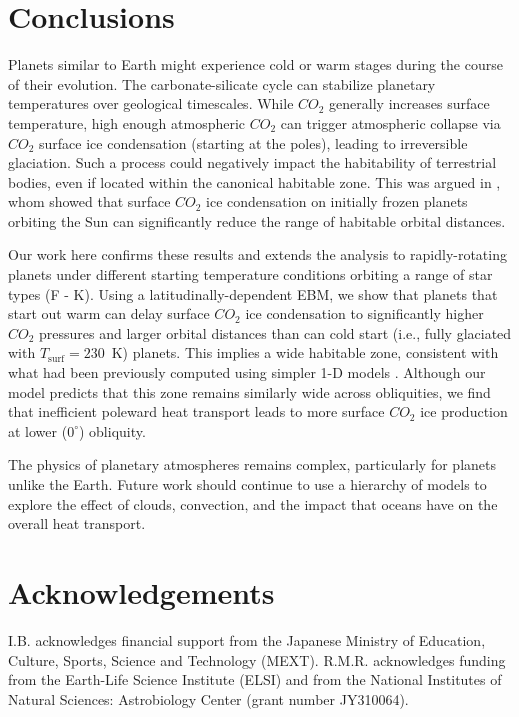\documentclass[fleqn,usenatbib]{mnras}
\begin{document}
\section{Conclusions}
Planets similar to Earth might experience cold or warm stages during the course of their evolution. The carbonate-silicate cycle can stabilize planetary temperatures over geological timescales. While  $CO_{\mathrm{2}}$ generally increases surface temperature, high enough atmospheric $CO_{\mathrm{2}}$ can trigger atmospheric collapse via $CO_{\mathrm{2}}$ surface ice condensation (starting at the poles), leading to irreversible glaciation. Such a process could negatively impact the habitability of terrestrial bodies, even if located within the canonical habitable zone. This was argued in \citet{Turbet2017}, whom showed that surface $CO_{\mathrm{2}}$ ice condensation on initially frozen planets orbiting the Sun can significantly reduce the range of habitable orbital distances. 

Our work here confirms these results and extends the analysis to rapidly-rotating planets under different starting temperature conditions orbiting a range of star types (F - K). Using a latitudinally-dependent EBM, we show that planets that start out warm can delay surface $CO_{\mathrm{2}}$ ice condensation to significantly higher $CO_{\mathrm{2}}$ pressures and larger orbital distances than can cold start (i.e., fully glaciated with $T_{\mathrm{surf}}=230$~K) planets. This implies a wide habitable zone, consistent with what had been previously computed using simpler 1-D models \citep{kasting1993,KumarKopparapu2013,Ramirez2018}. Although our model predicts that this zone remains similarly wide across obliquities, we find that inefficient poleward heat transport leads to more surface  $CO_{\mathrm{2}}$ ice production at lower ($0^{\circ}$) obliquity. 

The physics of planetary atmospheres remains complex, particularly for planets unlike the Earth. Future work should continue to use a hierarchy of models to explore the effect of clouds, convection, and the impact that oceans have on the overall heat transport. 

\section*{Acknowledgements}
I.B. acknowledges financial support from the Japanese Ministry of Education, Culture, Sports, Science and Technology (MEXT).
R.M.R. acknowledges funding from the Earth-Life Science Institute (ELSI) and from the National Institutes of Natural Sciences: Astrobiology Center (grant number JY310064).
\end{document}
